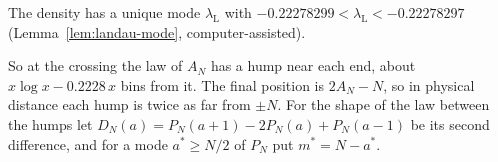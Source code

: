 The density has a unique mode $\lambda_{\mathrm L}$ with
$-0.22278299<\lambda_{\mathrm L}<-0.22278297$
(Lemma~\ref{lem:landau-mode}, computer-assisted).


So at the crossing the law of $A_N$ has a hump near each end, about
$x\log x-0.2228\,x$ bins from it. The final position is $2A_N-N$, so in
physical distance each hump is twice as far from $\pm N$. For the shape of the law between
the humps let $D_N(a)=P_N(a+1)-2P_N(a)+P_N(a-1)$ be its second difference,
and for a mode $a^*\ge N/2$ of $P_N$ put $m^*=N-a^*$.
